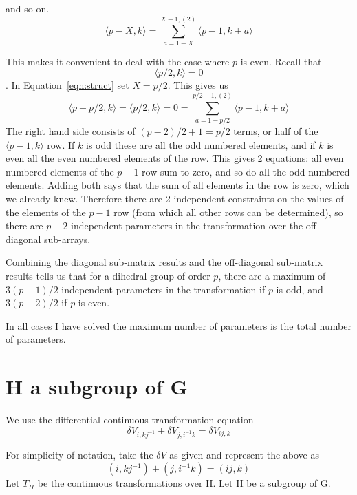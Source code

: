 \documentclass{revtex4-1}
\begin{document}
and so on.
\begin{equation} \label{eqn:struct}
\langle p-X, k \rangle = \sum_{a=1-X}^{X-1 , (2)} \langle p-1, k+a \rangle
\end{equation}

This makes it convenient to deal with the case where $p$ is even.  Recall that
$$\langle p/2, k \rangle=0$$.  In Equation~\ref{eqn:struct} set $X=p/2$.  This gives us
\begin{equation}
\langle p-p/2, k \rangle = \langle p/2, k \rangle = 0 = \sum_{a=1-p/2}^{p/2-1, (2)} \langle p-1, k+a \rangle
\end{equation}
The right hand side consists of $(p-2)/2 +1 =p/2$ terms, or half of the $\langle p-1,  k \rangle$ row.
If $k$ is odd these are all the odd numbered elements, and if $k$ is even all the even numbered
elements of the row.  This gives 2 equations:  all even numbered elements of the $p-1$ row
sum to zero, and so do all the odd numbered elements.  Adding both says that the sum of all
elements in the row is zero, which we already knew.  Therefore there are 2 independent
constraints on the values of the elements of the $p-1$ row (from which all other rows can
be determined), so there are $p-2$ independent parameters in the transformation over the 
off-diagonal sub-arrays.

\par Combining the diagonal sub-matrix results and the off-diagonal sub-matrix results tells us
that for a dihedral group of order $p$, there are a maximum of $3(p-1)/2$ independent
parameters in the transformation if $p$ is odd, and $3(p-2)/2$ if $p$ is even.

\par In all cases I have solved the maximum number of parameters is the total number of parameters.
\section{H a subgroup of G}

We use the differential continuous transformation equation
\begin{equation}
\delta V_{i,kj^{-1}} + \delta V_{j,i^{-1}k} = \delta V_{ij,k}
\end{equation}
\par For simplicity of notation, take the $\delta V$ as given and
represent the above as 
\begin{equation}
(i,kj^{-1})+ (j,i^{-1}k) = (ij,k)
\end{equation}
Let $T_H$ be the continuous transformations over H. Let H be a subgroup of G.
\end{document}
